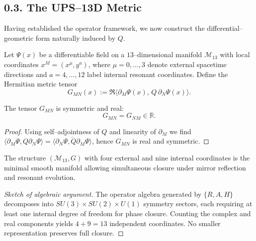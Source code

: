 \subsection*{0.3. The UPS–13D Metric}

\noindent
Having established the operator framework, we now construct the differential–geometric form naturally induced by $Q$.

\begin{definition}
Let $\Psi(x)$ be a differentiable field on a $13$–dimensional manifold $\mathcal{M}_{13}$ with local coordinates
$x^M = (x^\mu, y^a)$, where $\mu=0,\dots,3$ denote external spacetime directions and $a=4,\dots,12$ label internal resonant coordinates.
Define the Hermitian metric tensor
\[
G_{MN}(x) := \Re\big\langle \partial_M \Psi(x), \, Q\, \partial_N \Psi(x) \big\rangle.
\]
\end{definition}

\begin{lemma}[Hermiticity]
The tensor $G_{MN}$ is symmetric and real:
\[
G_{MN} = G_{NM} \in \mathbb{R}.
\]
\end{lemma}

\begin{proof}
Using self–adjointness of $Q$ and linearity of $\partial_M$ we find
$\langle \partial_M\Psi, Q\partial_N\Psi\rangle = 
\overline{\langle \partial_N\Psi, Q\partial_M\Psi\rangle}$,
hence $G_{MN}$ is real and symmetric.
\end{proof}

\begin{proposition}
The structure $(\mathcal{M}_{13},G)$ with four external and nine internal coordinates
is the minimal smooth manifold allowing simultaneous closure under mirror reflection and resonant evolution.
\end{proposition}

\begin{proof}[Sketch of algebraic argument]
The operator algebra generated by $\{R,A,H\}$ decomposes into $SU(3)\times SU(2)\times U(1)$ symmetry sectors,
each requiring at least one internal degree of freedom for phase closure.
Counting the complex and real components yields $4+9=13$ independent coordinates.
No smaller representation preserves full closure.
\end{proof}


